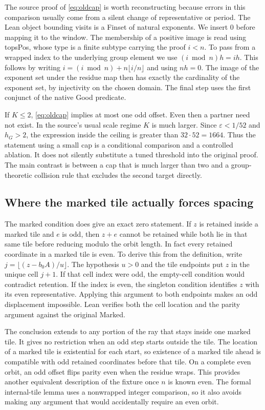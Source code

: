 \documentclass[12pt,letterpaper]{article}
\DeclareRobustCommand{\id}[1]{\mbox{\small\ttfamily #1}}
\begin{document}
The source proof of \eqref{eq:oldcap} is worth reconstructing because errors in this comparison usually come from a silent change of representative or period. The Lean object bounding visits is a \id{Finset} of natural exponents. We insert $0$ before mapping it to the window. The membership of a positive image is read using \id{topsPos}, whose type is a finite subtype carrying the proof $i<n$. To pass from a wrapped index to the underlying group element we use $(i\bmod n)h=ih$. This follows by writing $i=(i\bmod n)+n\lfloor i/n\rfloor$ and using $nh=0$. The image of the exponent set under the residue map then has exactly the cardinality of the exponent set, by injectivity on the chosen domain. The final step uses the first conjunct of the native Good predicate.

If $K\le2$, \eqref{eq:oldcap} implies at most one odd offset. Even then a partner need not exist. In the source’s usual scale regime $K$ is much larger. Since $\varepsilon<1/52$ and $h_G>2$, the expression inside the ceiling is greater than $32\cdot52=1664$. Thus the statement using a small cap is a conditional comparison and a controlled ablation. It does not silently substitute a tuned threshold into the original proof. The main contrast is between a cap that is much larger than two and a group-theoretic collision rule that excludes the second target directly.

\subsection{Where the marked tile actually forces spacing}

The marked condition does give an exact zero statement. If $z$ is retained inside a marked tile and $e$ is odd, then $z+e$ cannot be retained while both lie in that same tile before reducing modulo the orbit length. In fact every retained coordinate in a marked tile is even. To derive this from the definition, write $j=\lfloor(z-b_0A)/u\rfloor$. The hypothesis $u>0$ and the tile endpoints put $z$ in the unique cell $j+1$. If that cell index were odd, the empty-cell condition would contradict retention. If the index is even, the singleton condition identifies $z$ with its even representative. Applying this argument to both endpoints makes an odd displacement impossible. Lean verifies both the cell location and the parity argument against the original \id{Marked}.

The conclusion extends to any portion of the ray that stays inside one marked tile. It gives no restriction when an odd step starts outside the tile. The location of a marked tile is existential for each start, so existence of a marked tile ahead is compatible with odd retained coordinates before that tile. On a complete even orbit, an odd offset flips parity even when the residue wraps. This provides another equivalent description of the fixture once $n$ is known even. The formal internal-tile lemma uses a nonwrapped integer comparison, so it also avoids making any argument that would accidentally require an even orbit.
\end{document}
